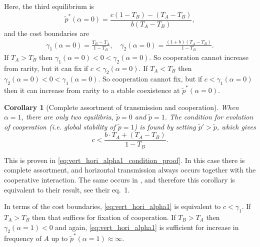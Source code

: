 \documentclass[12pt]{extarticle}
\newtheorem{corollary}{Corollary}
\begin{document}
{Here, the third equilibrium is
\begin{equation} \label{eq:vert_hori_alpha0_equilibrium}
\tilde{p}^*(\alpha=0) = \frac{c(1-T_B) - (T_A-T_B)}{b (T_A-T_B) },
\end{equation} 
and the cost boundaries are
\begin{equation}\begin{aligned}
\gamma_1(\alpha=0) = \frac{T_B - T_A}{1-T_B}, \quad
\gamma_2(\alpha=0) = \frac{(1+b) (T_A - T_B)}{1-T_B}.
\end{aligned}\end{equation}
If $T_A>T_B$ then $\gamma_1(\alpha=0)<0<\gamma_2(\alpha=0)$.
So cooperation cannot increase from rarity, but it can fix if $c<\gamma_2(\alpha=0)$.
If $T_A<T_B$ then $\gamma_2(\alpha=0)<0<\gamma_1(\alpha=0)$.
So cooperation cannot fix, but if $c<\gamma_1(\alpha=0)$ then it can increase from rarity to a stable coexistence at $\tilde{p}^*(\alpha=0)$.
\\

\begin{corollary}[Complete assortment of transmission and cooperation]
When $\alpha=1$, there are only two equilibria, $\tilde{p}=0$ and $\tilde{p}=1$.
The condition for evolution of cooperation (i.e. global stability of $\tilde{p}=1$) is found by setting $\tilde{p}'>\tilde{p}$, which gives
\begin{equation}\label{eq:vert_hori_alpha1}
c < \frac{b \cdot T_A + (T_A - T_B)}{1-T_B}.
\end{equation}
\end{corollary}
This is proven in \autoref{eq:vert_hori_alpha1_condition_proof}.
In this case there is complete assortment, and horizontal transmission always occurs together with the cooperative interaction. The same occurs in \citet{lewin2017microbes}, and therefore this corollary is equivalent to their result, see their eq.~1.

In terms of the cost boundaries, \autoref{eq:vert_hori_alpha1} is equivalent to $c<\gamma_1$. If $T_A>T_B$ then that suffices for fixation of cooperation. If $T_B>T_A$ then $\gamma_2(\alpha=1)<0$ and again, \autoref{eq:vert_hori_alpha1} is sufficient for increase in frequency of $A$ up to $\tilde{p}^*(\alpha=1) \approx \infty$.

}
\end{document}

